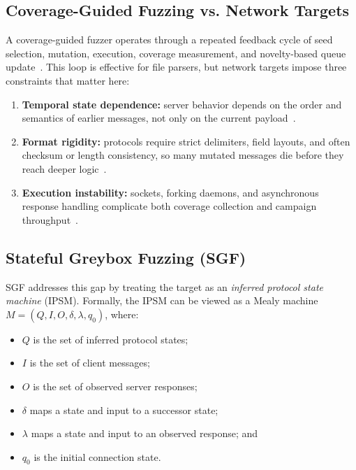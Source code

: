 \documentclass[conference]{IEEEtran}
\begin{document}
\subsection{Coverage-Guided Fuzzing vs. Network Targets}
A coverage-guided fuzzer operates through a repeated feedback cycle of seed selection, mutation, execution, coverage measurement, and novelty-based queue update~\cite{seed_selection_successful_fuzzing_2021,one_fuzzing_strategy_rule_2022,regression_greybox_fuzzing_2021,efficient_errors_2022}.
This loop is effective for file parsers, but network targets impose three constraints that matter here:
\begin{enumerate}
    \item \textbf{Temporal state dependence:} server behavior depends on the order and semantics of earlier messages, not only on the current payload~\cite{aflnet,stateafl,sgf_usenix22,formatted_stateful_greybox_fuzzing_2024}.
    \item \textbf{Format rigidity:} protocols require strict delimiters, field layouts, and often checksum or length consistency, so many mutated messages die before they reach deeper logic~\cite{gramatron_effective_grammar_aware_2021,griffin_grammar_free_dbms_2022,formatted_stateful_greybox_fuzzing_2024}.
    \item \textbf{Execution instability:} sockets, forking daemons, and asynchronous response handling complicate both coverage collection and campaign throughput~\cite{snapfuzz_high_throughput_fuzzing_2022}.
\end{enumerate}

\subsection{Stateful Greybox Fuzzing (SGF)}
SGF addresses this gap by treating the target as an \emph{inferred protocol state machine} (IPSM). Formally, the IPSM can be viewed as a Mealy machine $M = (Q, I, O, \delta, \lambda, q_0)$, where:
\begin{itemize}
    \item $Q$ is the set of inferred protocol states;
    \item $I$ is the set of client messages;
    \item $O$ is the set of observed server responses;
    \item $\delta$ maps a state and input to a successor state;
    \item $\lambda$ maps a state and input to an observed response; and
    \item $q_0$ is the initial connection state.
\end{itemize}
\end{document}
